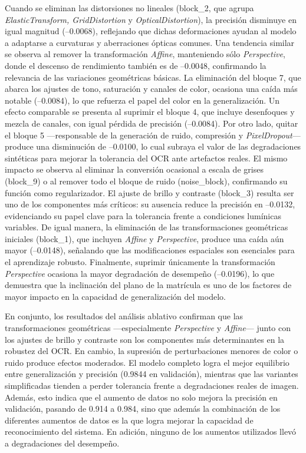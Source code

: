 Cuando se eliminan las distorsiones no lineales (block\_2,
que agrupa \emph{ElasticTransform, GridDistortion} y \emph{OpticalDistortion}),
la precisión disminuye en igual magnitud (–0.0068),
reflejando que dichas deformaciones ayudan al modelo a adaptarse a curvaturas y aberraciones ópticas comunes. 
Una tendencia similar se observa al remover la transformación \emph{Affine}, 
manteniendo sólo \emph{Perspective},
donde el descenso de rendimiento también es de –0.0048, confirmando la relevancia de las variaciones geométricas básicas.
La eliminación del bloque 7, que abarca los ajustes de tono, saturación y canales de color,
ocasiona una caída más notable (–0.0084), lo que refuerza el papel del color en la generalización.
Un efecto comparable se presenta al suprimir el bloque 4,
que incluye desenfoques y mezcla de canales, con igual pérdida de precisión (–0.0084).
Por otro lado, quitar el bloque 5 ---responsable de la generación de ruido, compresión y \emph{PixelDropout}---
produce una disminución de –0.0100, 
lo cual subraya el valor de las degradaciones sintéticas para mejorar la tolerancia del OCR ante artefactos reales.
El mismo impacto se observa al eliminar la conversión ocasional a escala de grises (block\_9)
o al remover todo el bloque de ruido (noise\_block), confirmando su función como regularizador.
El ajuste de brillo y contraste (block\_3) resulta ser uno de los componentes más críticos: 
su ausencia reduce la precisión en –0.0132,
evidenciando su papel clave para la tolerancia frente a condiciones lumínicas variables.
De igual manera, la eliminación de las transformaciones geométricas iniciales (block\_1),
que incluyen \emph{Affine} y \emph{Perspective}, produce una caída aún mayor (–0.0148),
señalando que las modificaciones espaciales son esenciales para el aprendizaje robusto.
Finalmente, suprimir únicamente la transformación \emph{Perspective}
ocasiona la mayor degradación de desempeño (–0.0196), lo que demuestra que la inclinación del plano de la matrícula
es uno de los factores de mayor impacto en la capacidad de generalización del modelo. 

En conjunto, los resultados del análisis ablativo confirman que las transformaciones geométricas 
---especialmente \emph{Perspective} y \emph{Affine}--- 
junto con los ajustes de brillo y contraste son los componentes más determinantes en la robustez del OCR. 
En cambio, la supresión de perturbaciones menores de color o ruido produce efectos moderados.
El modelo completo logra el mejor equilibrio entre generalización y precisión (0.9844 en validación), 
mientras que las variantes simplificadas tienden a perder tolerancia frente a degradaciones reales de imagen.
Además, esto indica que el aumento de datos no solo mejora la precisión en validación,
pasando de 0.914 a 0.984, sino que además la combinación de los diferentes aumentos de datos
es la que logra mejorar la capacidad de reconocimiento del sistema. 
En adición, ninguno de los aumentos utilizados llevó a degradaciones del desempeño.



